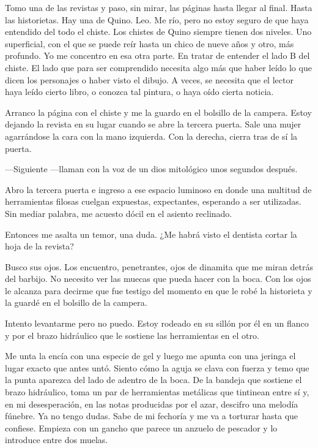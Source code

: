 \documentclass[11pt,twoside,openright]{book}
\begin{document}
 Tomo una de las revistas y paso, sin mirar, las páginas hasta llegar al final.
 Hasta las historietas. Hay una de Quino. Leo. Me río, pero no estoy seguro de
 que haya entendido del todo el chiste. Los chistes de Quino siempre tienen dos
 niveles. Uno superficial, con el que se puede reír hasta un chico de nueve años
 y otro, más profundo. Yo me concentro en esa otra parte. En tratar de entender
 el lado B del chiste. El lado que para ser comprendido necesita algo más que
 haber leído lo que dicen los personajes o haber visto el dibujo. A veces, se
 necesita que el lector haya leído cierto libro, o conozca tal pintura, o haya
 oído cierta noticia.
 
 Arranco la página con el chiste y me la guardo en el bolsillo de la campera.
 Estoy dejando la revista en su lugar cuando se abre la tercera puerta. Sale una
 mujer agarrándose la cara con la mano izquierda. Con la derecha, cierra tras de
 sí la puerta.
 
 ---Siguiente ---llaman con la voz de un dios mitológico unos segundos después.
 
 Abro la tercera puerta e ingreso a ese espacio luminoso en donde una multitud
 de herramientas filosas cuelgan expuestas, expectantes, esperando a ser
 utilizadas. Sin mediar palabra, me acuesto dócil en el asiento reclinado.
 
 Entonces me asalta un temor, una duda. ¿Me habrá visto el dentista cortar la
 hoja de la revista?
 
 Busco sus ojos. Los encuentro, penetrantes, ojos de dinamita que me miran
 detrás del barbijo. No necesito ver las muecas que pueda hacer con la boca. Con
 los ojos le alcanza para decirme que fue testigo del momento en que le robé la
 historieta y la guardé en el bolsillo de la campera.
 
 Intento levantarme pero no puedo. Estoy rodeado en su sillón por él en un
 flanco y por el brazo hidráulico que le sostiene las herramientas en el otro.
 
 Me unta la encía con una especie de gel y luego me apunta con una jeringa el
 lugar exacto que antes untó. Siento cómo la aguja se clava con fuerza y temo
 que la punta aparezca del lado de adentro de la boca. De la bandeja que
 sostiene el brazo hidráulico, toma un par de herramientas metálicas que
 tintinean entre sí y, en mi desesperación, en las notas producidas por el azar,
 descifro una melodía fúnebre.  Ya no tengo dudas. Sabe de mi fechoría y me va a
 torturar hasta que confiese.  Empieza con un gancho que parece un anzuelo de
 pescador y lo introduce entre dos muelas.
 
\end{document}
